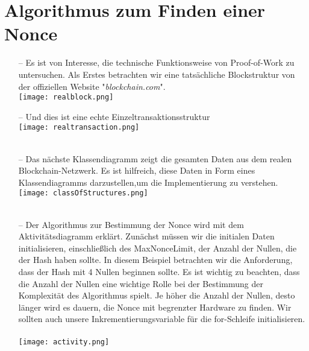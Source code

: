 \documentclass[ngerman]{scrreprt}
\begin{document}
\section{Algorithmus zum Finden einer Nonce}
\begin{itemize}
	\item[--] Es ist von Interesse, die technische Funktionsweise von Proof-of-Work zu untersuchen. Als Erstes betrachten wir eine tatsächliche Blockstruktur von der offiziellen Website "\textit{blockchain.com}".\\
	\texttt{[image: realblock.png]} \\
	
	
	\item[--] Und dies ist eine echte Einzeltransaktionsstruktur \\
	\texttt{[image: realtransaction.png]} \\ \\
	
	
	\item[--] Das nächste Klassendiagramm zeigt die gesamten Daten aus dem realen Blockchain-Netzwerk. Es ist hilfreich, diese Daten in Form eines Klassendiagramms darzustellen,um die Implementierung zu verstehen.\\
	\texttt{[image: classOfStructures.png]} \\ \\
	
	
	\item[--] Der Algorithmus zur Bestimmung der Nonce wird mit dem Aktivitätsdiagramm erklärt. Zunächst müssen wir die initialen Daten initialisieren, einschließlich des MaxNonceLimit, der Anzahl der Nullen, die der Hash haben sollte. In diesem Beispiel betrachten wir die Anforderung, dass der Hash mit 4 Nullen beginnen sollte. Es ist wichtig zu beachten, dass die Anzahl der Nullen eine wichtige Rolle bei der Bestimmung der Komplexität des Algorithmus spielt. Je höher die Anzahl der Nullen, desto länger wird es dauern, die Nonce mit begrenzter Hardware zu finden. Wir sollten auch unsere Inkrementierungsvariable für die for-Schleife initialisieren. \\ \\
	\texttt{[image: activity.png]} \\ \\
		
\end{itemize}
\end{document}

